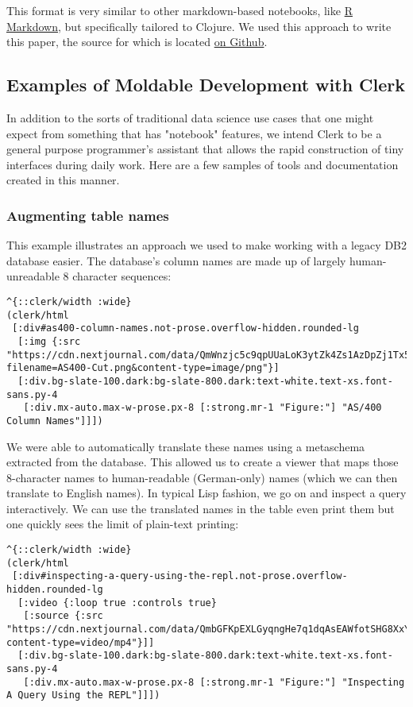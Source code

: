 \documentclass[
]{article}
\begin{document}
This format is very similar to other markdown-based notebooks, like \href{https://rmarkdown.rstudio.com}{R Markdown}, but specifically tailored to Clojure. We used this approach to write this paper, the source for which is located \href{https://github.com/mk/clerk-px23}{on Github}.

\hypertarget{id}{%
\subsection{Examples of Moldable Development with Clerk}\label{id}}

In addition to the sorts of traditional data science use cases that one might expect from something that has "notebook" features, we intend Clerk to be a general purpose programmer's assistant that allows the rapid construction of tiny interfaces during daily work. Here are a few samples of tools and documentation created in this manner.

\hypertarget{id}{%
\subsubsection{Augmenting table names}\label{id}}

This example illustrates an approach we used to make working with a legacy DB2 database easier. The database's column names are made up of largely human-unreadable 8 character sequences:

\begin{lstlisting}
^{::clerk/width :wide}
(clerk/html
 [:div#as400-column-names.not-prose.overflow-hidden.rounded-lg
  [:img {:src "https://cdn.nextjournal.com/data/QmWnzjc5c9qpUUaLoK3ytZk4Zs1AzDpZj1Tx5FF4ZR8a5t?filename=AS400-Cut.png&content-type=image/png"}]
  [:div.bg-slate-100.dark:bg-slate-800.dark:text-white.text-xs.font-sans.py-4
   [:div.mx-auto.max-w-prose.px-8 [:strong.mr-1 "Figure:"] "AS/400 Column Names"]]])
\end{lstlisting}

We were able to automatically translate these names using a metaschema extracted from the database. This allowed us to create a viewer that maps those 8-character names to human-readable (German-only) names (which we can then translate to English names). In typical Lisp fashion, we go on and inspect a query interactively. We can use the translated names in the table even print them but one quickly sees the limit of plain-text printing:

\begin{lstlisting}
^{::clerk/width :wide}
(clerk/html
 [:div#inspecting-a-query-using-the-repl.not-prose.overflow-hidden.rounded-lg
  [:video {:loop true :controls true}
   [:source {:src "https://cdn.nextjournal.com/data/QmbGFKpEXLGyqngHe7q1dqAsEAWfotSHG8XxYZPQfHirQ1?content-type=video/mp4"}]]
  [:div.bg-slate-100.dark:bg-slate-800.dark:text-white.text-xs.font-sans.py-4
   [:div.mx-auto.max-w-prose.px-8 [:strong.mr-1 "Figure:"] "Inspecting A Query Using the REPL"]]])
\end{lstlisting}
\end{document}
